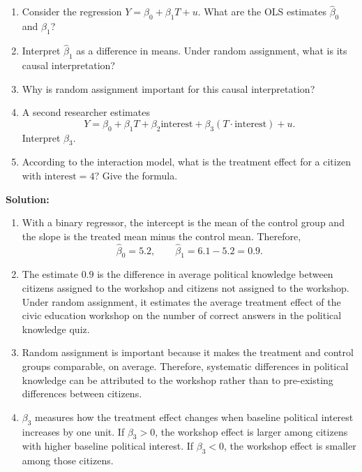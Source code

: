 \documentclass[12pt]{article}
\newif\ifsolutions
\begin{document}
\begin{enumerate}
    \begin{enumerate}[label=(\alph*)]
        \item Consider the regression \(Y = \beta_0 + \beta_1T + u\). What are the OLS estimates \(\widehat\beta_0\) and \(\widehat\beta_1\)?
        \item Interpret \(\widehat\beta_1\) as a difference in means. Under random assignment, what is its causal interpretation?
        \item Why is random assignment important for this causal interpretation?
        \item A second researcher estimates
        \[
            Y = \beta_0 + \beta_1T + \beta_2\text{interest}
            + \beta_3(T\cdot \text{interest}) + u.
        \]
        Interpret \(\beta_3\).
        \item According to the interaction model, what is the treatment effect for a citizen with \(\text{interest}=4\)? Give the formula.
    \end{enumerate}
    
    \ifsolutions \color{blue} \textbf{Solution:} \\
    \begin{enumerate}[label=(\alph*)]
        \item With a binary regressor, the intercept is the mean of the control group and the slope is the treated mean minus the control mean. Therefore,
        \[
            \widehat\beta_0 = 5.2,
            \qquad
            \widehat\beta_1 = 6.1 - 5.2 = 0.9.
        \]
        
        \item The estimate \(0.9\) is the difference in average political knowledge between citizens assigned to the workshop and citizens not assigned to the workshop. Under random assignment, it estimates the average treatment effect of the civic education workshop on the number of correct answers in the political knowledge quiz.
        
        \item Random assignment is important because it makes the treatment and control groups comparable, on average. Therefore, systematic differences in political knowledge can be attributed to the workshop rather than to pre-existing differences between citizens.
        
        \item \(\beta_3\) measures how the treatment effect changes when baseline political interest increases by one unit. If \(\beta_3>0\), the workshop effect is larger among citizens with higher baseline political interest. If \(\beta_3<0\), the workshop effect is smaller among those citizens.
        

\end{enumerate}
\end{enumerate}
\end{document}
